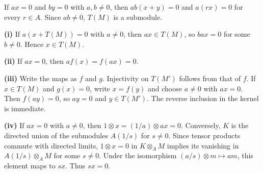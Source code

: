 If $ax=0$ and $by=0$ with $a,b\ne0$, then $ab(x+y)=0$ and $a(rx)=0$ for every $r\in A$. Since $ab\ne0$, $T(M)$ is a submodule.

\textbf{(i)} If $a(x+T(M))=0$ with $a\ne0$, then $ax\in T(M)$, so $bax=0$ for some $b\ne0$. Hence $x\in T(M)$.

\textbf{(ii)} If $ax=0$, then $af(x)=f(ax)=0$.

\textbf{(iii)} Write the maps as $f$ and $g$. Injectivity on $T(M')$ follows from that of $f$. If $x\in T(M)$ and $g(x)=0$, write $x=f(y)$ and choose $a\ne0$ with $ax=0$. Then $f(ay)=0$, so $ay=0$ and $y\in T(M')$. The reverse inclusion in the kernel is immediate.

\textbf{(iv)} If $ax=0$ with $a\ne0$, then $1\otimes x=(1/a)\otimes ax=0$. Conversely, $K$ is the directed union of the submodules $A(1/s)$ for $s\ne0$. Since tensor products commute with directed limits, $1\otimes x=0$ in $K\otimes_A M$ implies its vanishing in $A(1/s)\otimes_A M$ for some $s\ne0$. Under the isomorphism $(a/s)\otimes m\mapsto am$, this element maps to $sx$. Thus $sx=0$.
